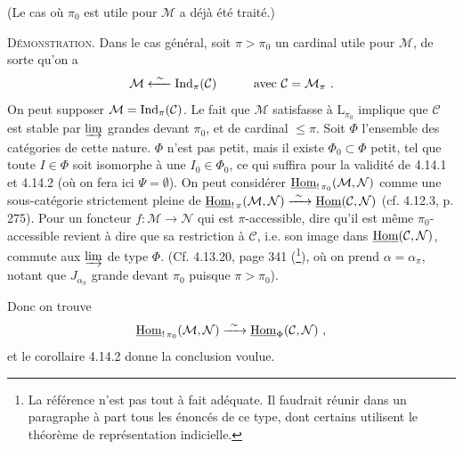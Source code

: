 
(Le cas où $\pi_0$ est utile pour $\mathcal{M}$ a déjà été traité.)

\noindent\textsc{Démonstration}. Dans le cas général, soit $\pi>\pi_0$ un cardinal utile pour $\mathcal{M}$, de sorte qu'on a
\[
\mathcal{M} \xleftarrow{\ \sim\ } \Ind_\pi(\mathcal{C}) \qquad\quad \text{avec } \mathcal{C}=\mathcal{M}_\pi\ .
\]
On peut supposer $\mathcal{M}=\operatorname{Ind}_\pi(\mathcal{C})$. Le fait que $\mathcal{M}$ satisfasse à $\mathrm{L}_{\pi_0}$ implique que $\mathcal{C}$ est stable par $\varinjlim$ grandes devant $\pi_0$, et de cardinal $\leqslant\pi$. Soit $\Phi$ l'ensemble des catégories de cette nature. $\Phi$ n'est pas petit, mais il existe $\Phi_0\subset\Phi$ petit, tel que toute $I\in\Phi$ soit isomorphe à une $I_0\in\Phi_0$, ce qui suffira pour la validité de 4.14.1 et 4.14.2 (où on fera ici $\Psi=\emptyset$). On peut considérer $\underline{\mathrm{Hom}}_{!\,\pi_0}(\mathcal{M},\mathcal{N})$ comme une sous-catégorie strictement pleine de $\uHom_{!\,\pi}(\mathcal{M},\mathcal{N})\xrightarrow{\ \sim\ }\uHom(\mathcal{C},\mathcal{N})$ (cf. 4.12.3, p. 275). Pour un foncteur $f:\mathcal{M}\longrightarrow\mathcal{N}$ qui est $\pi$-accessible, dire qu'il est même $\pi_0$-accessible revient à dire que sa restriction à $\mathcal{C}$, i.e. son image dans $\underline{\mathrm{Hom}}(\mathcal{C},\mathcal{N})$, commute aux $\varinjlim$ de type $\Phi$. (Cf. 4.13.20, page 341 (\footnote[164]{La référence n'est pas tout à fait adéquate. Il faudrait réunir dans un paragraphe à part tous les énoncés de ce type, dont certains utilisent le théorème de représentation indicielle.}), où on prend $\alpha=\alpha_\pi$, notant que $J_{\alpha_\pi}$ grande devant $\pi_0$ puisque $\pi>\pi_0$).


Donc on trouve
\[
\underline{\mathrm{Hom}}_{!\,\pi_0}(\mathcal{M},\mathcal{N}) \xrightarrow{\ \sim\ } \underline{\mathrm{Hom}}_{\Phi}(\mathcal{C},\mathcal{N})\ ,
\]
et le corollaire 4.14.2 donne la conclusion voulue.


